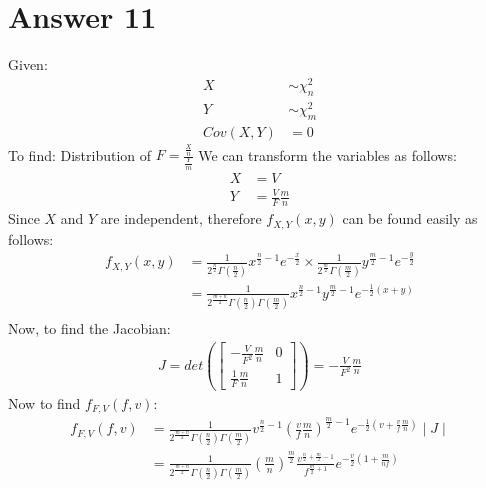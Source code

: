 \documentclass[a4paper]{article}
\begin{document}
\section{Answer 11}
Given:
\begin{equation*}
	\begin{split}
		X &\sim \chi^2_n\\
		Y &\sim \chi^2_m\\
		Cov\left( X,Y \right) &=  0
	\end{split}
\end{equation*}
To find: Distribution of $F = \frac{\frac{X}{n}}{\frac{Y}{m}}$ 
\newline\newline
We can transform the variables as follows:
\begin{equation*}
	\begin{split}
		X &=  V\\
		Y &=  \frac{V}{F} \frac{m}{n}
	\end{split}
\end{equation*}
Since $X$ and $Y$ are independent, therefore $f_{X,Y}\left( x,y \right) $ can be found easily as follows:
\begin{equation*}
	\begin{split}
		f_{X,Y}\left( x,y \right) &= \frac{1}{2^{\frac{n}{2}}\Gamma\left( \frac{n}{2} \right) } x^{\frac{n}{2}-1} e^{-\frac{x}{2}} \times \frac{1}{2^{\frac{m}{2}}\Gamma\left( \frac{m}{2} \right) } y^{\frac{m}{2}-1}e^{-\frac{y}{2}}\\
		&= \frac{1}{2^{\frac{m+n}{2}}\Gamma\left( \frac{n}{2} \right) \Gamma\left( \frac{m}{2} \right) } x^{\frac{n}{2}-1} y^{\frac{m}{2}-1} e^{-\frac{1}{2}\left( x+y \right) }\\
	\end{split}
\end{equation*}
Now, to find the Jacobian:
\begin{equation*}
	\begin{split}
		J = det\left( \begin{bmatrix} -\frac{V}{F^2}\frac{m}{n} & 0\\ \frac{1}{F}\frac{m}{n} & 1 \end{bmatrix}  \right) = -\frac{V}{F^2} \frac{m}{n} 
	\end{split}
\end{equation*}
Now to find $f_{F,V}\left( f,v \right) $:
\begin{equation*}
	\begin{split}
		f_{F,V}\left( f,v \right) &= \frac{1}{ 2^{\frac{m+n}{2}}\Gamma\left( \frac{n}{2} \right) \Gamma\left( \frac{m}{2} \right) } v^{\frac{n}{2}-1}  \left( \frac{v}{f}\frac{m}{n} \right) ^{\frac{m}{2}-1} e^{-\frac{1}{2}\left( v + \frac{v}{f}\frac{m}{n} \right) }  \mid J \mid \\
		&= \frac{1}{ 2^{\frac{m+n}{2}}\Gamma\left( \frac{n}{2} \right) \Gamma\left( \frac{m}{2} \right) } \left( \frac{m}{n} \right) ^{\frac{m}{2}} \frac{v^{\frac{n}{2}+\frac{m}{2}-1}}{f^{\frac{m}{2}+1}} e^{-\frac{v}{2}\left( 1+ \frac{m}{nf} \right) } 
	\end{split}
\end{equation*}
\end{document}
